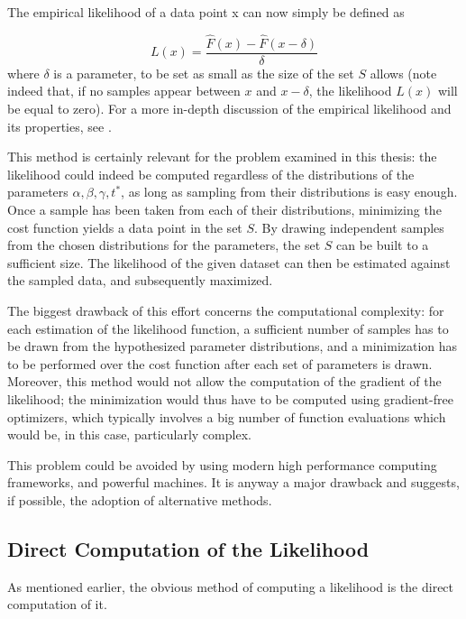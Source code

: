 The empirical likelihood of a data point x can now simply be defined as

\begin{equation}
  \label{eq:emp_lik}
  L(x) = \frac{\hat{F}(x) - \hat{F}(x - \delta)}{\delta}
\end{equation}
where \(\delta\) is a parameter,
to be set as small as the size of the set \(S\) allows
(note indeed that, if no samples appear between \(x\) and \(x - \delta\), the likelihood \(L(x)\) will be equal to zero).
For a more in-depth discussion of the empirical likelihood and its properties, see \textcite{annurev:/content/journals/10.1146/annurev-statistics-040720-024710}.

This method is certainly relevant for the problem examined in this thesis:
the likelihood could indeed be computed regardless of the distributions of the parameters \(\alpha, \beta, \gamma, t^*\),
as long as sampling from their distributions is easy enough.
Once a sample has been taken from each of their distributions,
minimizing the cost function yields a data point in the set \(S\).
By drawing independent samples from the chosen distributions for the parameters,
the set \(S\) can be built to a sufficient size.
The likelihood of the given dataset can then be estimated against the sampled data,
and subsequently maximized.

The biggest drawback of this effort concerns the computational complexity:
for each estimation of the likelihood function,
a sufficient number of samples has to be drawn from the hypothesized parameter distributions,
and a minimization has to be performed over the cost function after each set of parameters is drawn.
Moreover, this method would not allow the computation of the gradient of the likelihood;
the minimization would thus have to be computed using gradient-free optimizers,
which typically involves a big number of function evaluations \parencite{Larson_Menickelly_Wild_2019} which would be,
in this case, particularly complex.

This problem could be avoided by using modern high performance computing frameworks,
and powerful machines.
It is anyway a major drawback and suggests, if possible, the adoption of alternative methods.

\subsection{Direct Computation of the Likelihood}
\label{sec:lik_comp}

As mentioned earlier, the obvious method of computing a likelihood is the direct computation of it.


